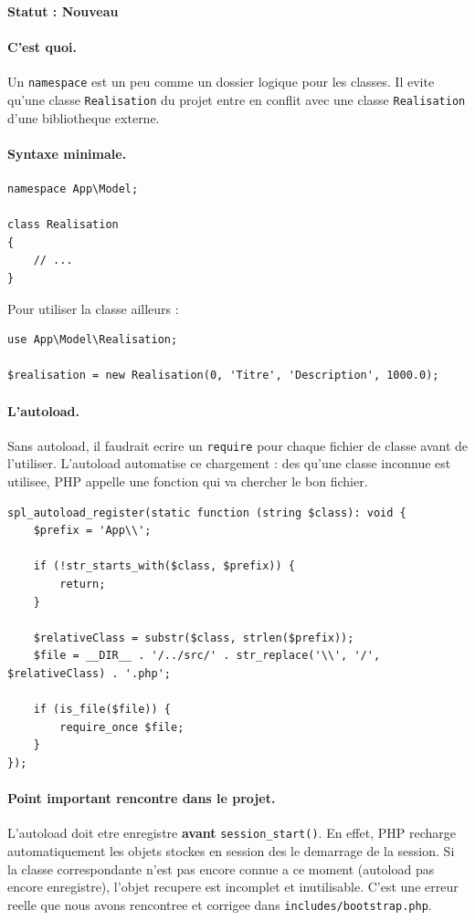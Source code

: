 \documentclass[11pt,a4paper]{article}
\newcommand{\statut}[1]{\textbf{Statut : #1}}
\begin{document}
\statut{Nouveau}

\paragraph{C'est quoi.}
Un \verb|namespace| est un peu comme un dossier logique pour les classes.
Il evite qu'une classe \verb|Realisation| du projet entre en conflit avec
une classe \verb|Realisation| d'une bibliotheque externe.

\paragraph{Syntaxe minimale.}

\begin{lstlisting}
namespace App\Model;

class Realisation
{
    // ...
}
\end{lstlisting}

Pour utiliser la classe ailleurs :

\begin{lstlisting}
use App\Model\Realisation;

$realisation = new Realisation(0, 'Titre', 'Description', 1000.0);
\end{lstlisting}

\paragraph{L'autoload.}
Sans autoload, il faudrait ecrire un \verb|require| pour chaque fichier de
classe avant de l'utiliser. L'autoload automatise ce chargement : des qu'une
classe inconnue est utilisee, PHP appelle une fonction qui va chercher le
bon fichier.

\begin{lstlisting}
spl_autoload_register(static function (string $class): void {
    $prefix = 'App\\';

    if (!str_starts_with($class, $prefix)) {
        return;
    }

    $relativeClass = substr($class, strlen($prefix));
    $file = __DIR__ . '/../src/' . str_replace('\\', '/', $relativeClass) . '.php';

    if (is_file($file)) {
        require_once $file;
    }
});
\end{lstlisting}

\paragraph{Point important rencontre dans le projet.}
L'autoload doit etre enregistre \textbf{avant} \verb|session_start()|. En
effet, PHP recharge automatiquement les objets stockes en session des le
demarrage de la session. Si la classe correspondante n'est pas encore
connue a ce moment (autoload pas encore enregistre), l'objet recupere est
incomplet et inutilisable. C'est une erreur reelle que nous avons rencontree
et corrigee dans \verb|includes/bootstrap.php|.
\end{document}
